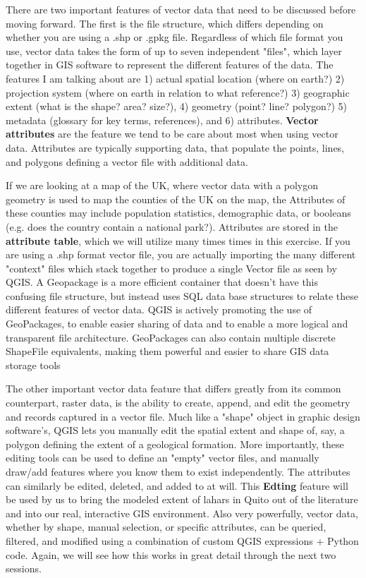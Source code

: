\documentclass{article}
\begin{document}
There are two important features of vector data that need to be discussed before moving forward. The first is the file structure, which differs depending on whether you are using a .shp or .gpkg file. Regardless of which file format you use, vector data takes the form of up to seven independent "files", which layer together in GIS software to represent the different features of the data. The features I am talking about are 1) actual spatial location (where on earth?) 2) projection system (where on earth in relation to what reference?) 3) geographic extent (what is the shape? area? size?), 4) geometry (point? line? polygon?) 5) metadata (glossary for key terms, references), and 6) attributes. \textbf{Vector attributes} are the feature we tend to be care about most when using vector data. Attributes are typically supporting data, that populate the points, lines, and polygons defining a vector file with additional data. 

If we are looking at a map of the UK, where vector data with a polygon geometry is used to map the counties of the UK on the map, the Attributes of these counties may include population statistics, demographic data, or booleans (e.g. does the country contain a national park?). Attributes are stored in the \textbf{attribute table}, which we will utilize many times times in this exercise. If you are using a .shp format vector file, you are actually importing the many different "context" files which stack together to produce a single Vector file as seen by QGIS. A Geopackage is a more efficient container that doesn't have this confusing file structure, but instead uses SQL data base structures to relate these different features of vector data. QGIS is actively promoting the use of GeoPackages, to enable easier sharing of data and to enable a more logical and transparent file architecture. GeoPackages can also contain multiple discrete ShapeFile equivalents, making them powerful and easier to share GIS data storage tools 

The other important vector data feature that differs greatly from its common counterpart, raster data, is the ability to create, append, and edit the geometry and records captured in a vector file. Much like a "shape" object in graphic design software's, QGIS lets you manually edit the spatial extent and shape of, say, a polygon defining the extent of a geological formation. More importantly, these editing tools can be used to define an "empty" vector files, and manually draw/add features where you know them to exist independently. The attributes can similarly be edited, deleted, and added to at will. This \textbf{Edting} feature will be used by us to bring the modeled extent of lahars in Quito out of the literature and into our real, interactive GIS environment. Also very powerfully, vector data, whether by shape, manual selection, or specific attributes, can be queried, filtered, and modified using a combination of custom QGIS expressions + Python code. Again, we will see how this works in great detail through the next two sessions. 
\end{document}
